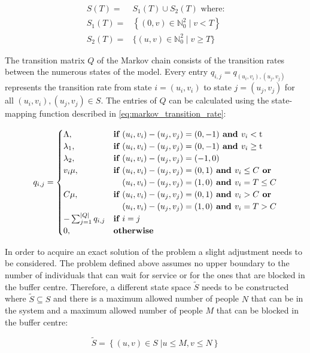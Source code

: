 \begin{align}
    S(T) =& S_1(T) \cup S_2(T) \text{ where:} \nonumber \\
    S_1(T) =& \left\{(0, v)\in\mathbb{N}_0^2 \; | \; v < T \right\} 
    \label{eq:state_space} \\
    S_2(T) =& \{(u, v)\in\mathbb{N}_0^2 \; | \; v \geq T \} \nonumber
\end{align}

The transition matrix \(Q\) of the Markov chain consists of the transition rates
between the numerous states of the model. Every entry \( q_{i,j} = 
q_{(u_i, v_i),(u_j, v_j)} \) represents the transition rate from state 
\( i = (u_i, v_i) \) to state \( j = (u_j , v_j) \) for all 
\( (u_i, v_i), (u_j, v_j) \in S \).
The entries of \(Q\) can be calculated using the state-mapping function 
described in \ref{eq:markov_transition_rate}: 

\begin{equation} \label{eq:markov_transition_rate}
    q_{i, j} = 
    \begin{cases}
        \Lambda, & \textbf{if } (u_i, v_i) - (u_j, v_j) = (0,-1) \textbf{ and } 
        v_i < \text{t} \\
        \lambda_1, & \textbf{if } (u_i, v_i) - (u_j, v_j) = (0,-1) \textbf{ and } 
        v_i \geq \text{t} \\
        \lambda_2, & \textbf{if } (u_i, v_i) - (u_j, v_j) = (-1,0) \\
        v_i \mu, & \textbf{if } (u_i, v_i) - (u_j, v_j) = (0,1) \textbf{ and } 
        v_i \leq C \textbf{ or} \\ & \hspace{0.37cm}(u_i, v_i) - (u_j, v_j) = (1,0) 
        \textbf{ and } v_i = T \leq C \\
        C \mu, & \textbf{if } (u_i, v_i) - (u_j, v_j) = (0,1) \textbf{ and } v_i > C 
        \textbf{ or} \\ & \hspace{0.37cm}(u_i, v_i) - (u_j, v_j) = (1,0) \textbf{ and } 
        v_i = T > C\\
        -\sum_{j=1}^{|Q|}{q_{i,j}} & \textbf{if } i = j \\
        0, & \textbf{otherwise}
    \end{cases}
\end{equation}


% 


In order to acquire an exact solution of the problem a slight adjustment needs to 
be considered. 
The problem defined above assumes no upper boundary to the number of individuals 
that can wait for service or for the ones that are blocked in the buffer centre. 
Therefore, a different state space \( \tilde S \) needs to be constructed where 
\( \tilde S \subseteq S \) and there is a maximum allowed number of people \(N\) 
that can be in the system and a maximum allowed number of people \(M\) that can
be blocked in the buffer centre:

\begin{equation}
    \tilde S = \left\{ (u, v) \in S\;| u \leq M, v\leq N \right\}
\end{equation}




